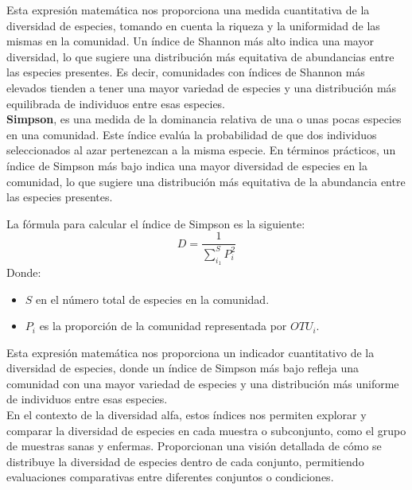 Esta expresión matemática nos proporciona una medida cuantitativa de la diversidad de especies, tomando en cuenta la riqueza y la uniformidad de las mismas en la comunidad. Un índice de Shannon más alto indica una mayor diversidad, lo que sugiere una distribución más equitativa de abundancias entre las especies presentes. Es decir, comunidades con índices de Shannon más elevados tienden a tener una mayor variedad de especies y una distribución más equilibrada de individuos entre esas especies.\\

\textbf{Simpson}, es una medida de la dominancia relativa de una o unas pocas especies en una comunidad. Este índice evalúa la probabilidad de que dos individuos seleccionados al azar pertenezcan a la misma especie. En términos prácticos, un índice de Simpson más bajo indica una mayor diversidad de especies en la comunidad, lo que sugiere una distribución más equitativa de la abundancia entre las especies presentes.

La fórmula para calcular el índice de Simpson es la siguiente:
$$D=\frac{1}{\sum_{i_1}^{S}{P_{i}^{2}}}$$
Donde:
\begin{itemize}
    \item $S$ en el número total de especies en la comunidad.
    \item $P_i$ es la proporción de la comunidad representada por $OTU_i$.
\end{itemize}

Esta expresión matemática nos proporciona un indicador cuantitativo de la diversidad de especies, donde un índice de Simpson más bajo refleja una comunidad con una mayor variedad de especies y una distribución más uniforme de individuos entre esas especies.\\

En el contexto de la diversidad alfa, estos índices nos permiten explorar y comparar la diversidad de especies en cada muestra o subconjunto, como el grupo de muestras sanas y enfermas. Proporcionan una visión detallada de cómo se distribuye la diversidad de especies dentro de cada conjunto, permitiendo evaluaciones comparativas entre diferentes conjuntos o condiciones.\\

